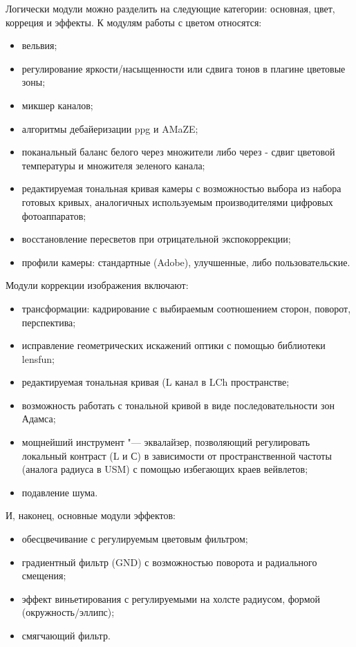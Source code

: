 \documentclass[10pt, a5paper]{article}
\begin{document}
Логически модули можно разделить на следующие категории: основная, цвет, корреция и эффекты.
К модулям работы с цветом относятся:
\begin{itemize}
\item вельвия;
\item регулирование яркости/насыщенности или сдвига тонов в плагине цветовые зоны;
\item микшер каналов;
\item алгоритмы дебайеризации ppg и AMaZE;
\item поканальный баланс белого через множители либо через  - сдвиг цветовой температуры и множителя зеленого канала;
\item редактируемая тональная кривая камеры с возможностью выбора из набора готовых кривых, аналогичных используемым производителями цифровых фотоаппаратов;
\item восстановление пересветов при отрицательной экспокоррекции;
\item профили камеры: стандартные (Adobe), улучшенные, либо пользовательские.
\end{itemize}
Модули коррекции изображения включают:
\begin{itemize}
\item трансформации: кадрирование с выбираемым соотношением сторон, поворот, перспектива;
\item исправление геометрических искажений оптики с помощью библиотеки lensfun;
\item редактируемая тональная кривая (L канал в LCh пространстве;
\item возможность работать с тональной кривой в виде последовательности зон Адамса;
\item мощнейший инструмент "--- эквалайзер, позволяющий регулировать локальный контраст (L и С) в зависимости от пространственной частоты (аналога радиуса в USM) с помощью избегающих краев вейвлетов;
\item подавление шума.
\end{itemize}
И, наконец, основные модули эффектов:
\begin{itemize}
\item обесцвечивание с регулируемым цветовым фильтром;
\item градиентный фильтр (GND) с возможностью поворота и радиального смещения;
\item эффект виньетирования с регулируемыми на холсте радиусом, формой (окружность/эллипс);
\item смягчающий фильтр.
\end{itemize}
\end{document}
